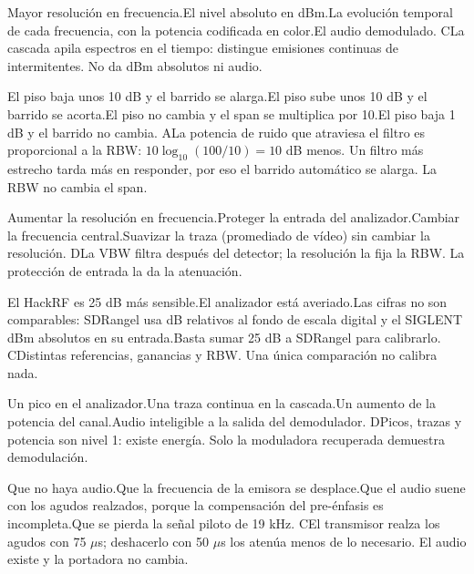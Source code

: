 {
{Mayor resolución en frecuencia.}{El nivel absoluto en dBm.}{La evolución temporal de cada frecuencia, con la potencia codificada en color.}{El audio demodulado.}
{C}{La cascada apila espectros en el tiempo: distingue emisiones continuas de intermitentes. No da dBm absolutos ni audio.}

{El piso baja unos 10 dB y el barrido se alarga.}{El piso sube unos 10 dB y el barrido se acorta.}{El piso no cambia y el span se multiplica por 10.}{El piso baja 1 dB y el barrido no cambia.}
{A}{La potencia de ruido que atraviesa el filtro es proporcional a la RBW: $10\log_{10}(100/10) = 10$ dB menos. Un filtro más estrecho tarda más en responder, por eso el barrido automático se alarga. La RBW no cambia el span.}

{Aumentar la resolución en frecuencia.}{Proteger la entrada del analizador.}{Cambiar la frecuencia central.}{Suavizar la traza (promediado de vídeo) sin cambiar la resolución.}
{D}{La VBW filtra después del detector; la resolución la fija la RBW. La protección de entrada la da la atenuación.}

{El HackRF es 25 dB más sensible.}{El analizador está averiado.}{Las cifras no son comparables: SDRangel usa dB relativos al fondo de escala digital y el SIGLENT dBm absolutos en su entrada.}{Basta sumar 25 dB a SDRangel para calibrarlo.}
{C}{Distintas referencias, ganancias y RBW. Una única comparación no calibra nada.}

{Un pico en el analizador.}{Una traza continua en la cascada.}{Un aumento de la potencia del canal.}{Audio inteligible a la salida del demodulador.}
{D}{Picos, trazas y potencia son nivel 1: existe energía. Solo la moduladora recuperada demuestra demodulación.}

{Que no haya audio.}{Que la frecuencia de la emisora se desplace.}{Que el audio suene con los agudos realzados, porque la compensación del pre-énfasis es incompleta.}{Que se pierda la señal piloto de 19 kHz.}
{C}{El transmisor realza los agudos con 75 $\mu$s; deshacerlo con 50 $\mu$s los atenúa menos de lo necesario. El audio existe y la portadora no cambia.}
}

